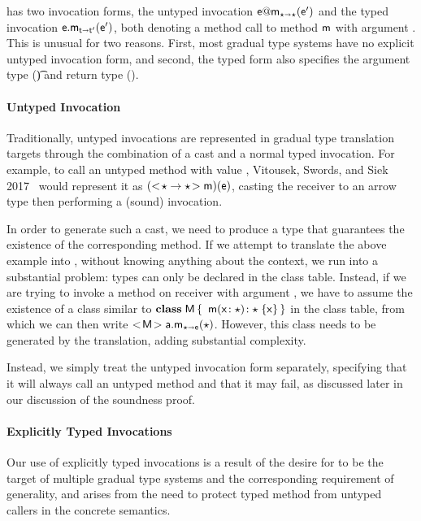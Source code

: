 \documentclass[USenglish]{tex/lipics-v2016}
\begin{document}
\kafka has two invocation forms, the untyped invocation $\DynCall\e\m\ep$ and
the typed invocation $\KCall\e\m\ep{\t}{\tp}$, both denoting a method call to 
method ${\sf{m}}$ with argument \ep. This is unusual for two reasons. First, most
gradual type systems have no explicit untyped invocation form, and second, the
typed form also specifies the argument type (\t) and return type (\tp).

\paragraph*{Untyped Invocation}

Traditionally, untyped invocations are represented in gradual type translation
targets through the combination of a cast and a normal typed invocation. For
example, to call an untyped method \m with value \e, Vitousek, Swords, and
Siek 2017~\cite{Vitousek2017} would represent it as $(\SubCast{\any
\rightarrow\any}{\m})(\e)$, casting the receiver to an arrow type then 
performing a (sound) invocation. 

In order to generate such a cast, we need to produce a type that guarantees
the existence of the corresponding method. If we attempt to translate the
above example into \kafka, without knowing anything about the context, we run
into a substantial problem: types can only be declared in the class table.
Instead, if we are trying to invoke a method \m on receiver \a with argument
\e, we have to assume the existence of a class similar to ${\sf{\bf class}}\;{\sf{M}}\,\{\,~ { {\sf{m}}( {{\sf{x}}}\!:{\star})}\!:{\star}\;\{{{\sf{x}}}\}\,\}$ in the class table, from which we can then write
$\KCall{\SubCast{\xt M}\a}\m\any\any\e$. However, this class needs to be
generated by the translation, adding substantial complexity.

Instead, we simply treat the untyped invocation form separately, specifying
that it will always call an untyped method and that it may fail, as discussed
later in our discussion of the \kafka soundness proof.

\paragraph*{Explicitly Typed Invocations}

Our use of explicitly typed invocations is a result of the desire for \kafka
to be the target of multiple gradual type systems and the corresponding
requirement of generality, and arises from the need to protect typed method
from untyped callers in the concrete semantics.
\end{document}
